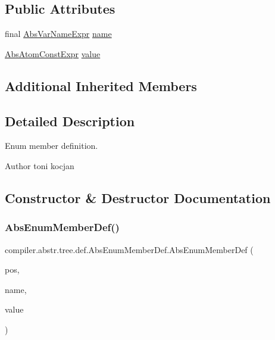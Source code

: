 \subsection*{Public Attributes}
\begin{DoxyCompactItemize}
\item 
final \hyperlink{classcompiler_1_1abstr_1_1tree_1_1expr_1_1_abs_var_name_expr}{Abs\+Var\+Name\+Expr} \hyperlink{classcompiler_1_1abstr_1_1tree_1_1def_1_1_abs_enum_member_def_a0a6c742fb2744551900fd38c08f4862e}{name}
\item 
\hyperlink{classcompiler_1_1abstr_1_1tree_1_1expr_1_1_abs_atom_const_expr}{Abs\+Atom\+Const\+Expr} \hyperlink{classcompiler_1_1abstr_1_1tree_1_1def_1_1_abs_enum_member_def_a7395b1d7a49198fb7761cc54990151be}{value}
\end{DoxyCompactItemize}
\subsection*{Additional Inherited Members}


\subsection{Detailed Description}
Enum member definition. \begin{DoxyAuthor}{Author}
toni kocjan 
\end{DoxyAuthor}


\subsection{Constructor \& Destructor Documentation}
\mbox{\label{classcompiler_1_1abstr_1_1tree_1_1def_1_1_abs_enum_member_def_afee3509d8ad95ce037e3de1f77f0ca54}} 
\subsubsection{\texorpdfstring{Abs\+Enum\+Member\+Def()}{AbsEnumMemberDef()}}
{\footnotesize\ttfamily compiler.\+abstr.\+tree.\+def.\+Abs\+Enum\+Member\+Def.\+Abs\+Enum\+Member\+Def (\begin{DoxyParamCaption}\item[{\hyperlink{classcompiler_1_1_position}{Position}}]{pos,  }\item[{\hyperlink{classcompiler_1_1abstr_1_1tree_1_1expr_1_1_abs_var_name_expr}{Abs\+Var\+Name\+Expr}}]{name,  }\item[{\hyperlink{classcompiler_1_1abstr_1_1tree_1_1expr_1_1_abs_atom_const_expr}{Abs\+Atom\+Const\+Expr}}]{value }\end{DoxyParamCaption})}

